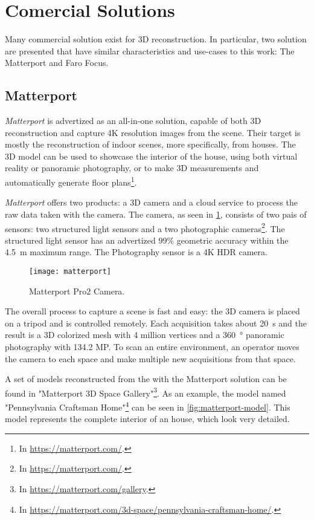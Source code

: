 \section{Comercial Solutions}

Many commercial solution exist for 3D reconstruction. In particular, two solution are presented that have similar characteristics and use-cases to this work: The Matterport and Faro Focus.

\subsection{Matterport}

\emph{Matterport} is advertized as an all-in-one solution, capable of both 3D reconstruction and capture 4K resolution images from the scene. Their target is mostly the reconstruction of indoor scenes, more specifically, from houses. The 3D model can be used to showcase the interior of the house, using both virtual reality or panoramic photography, or to make 3D measurements and automatically generate floor plans\footnote{In \url{https://matterport.com/}.}.

\emph{Matterport} offers two products: a 3D camera and a cloud service to process the raw data taken with the camera. The camera, as seen in \cref{fig:matterport-camera}, consists of two pais of sensors: two structured light sensors and a two photographic cameras\footnote{In \url{https://matterport.com/}.}. The structured light sensor has an advertized $99\%$ geometric accuracy within the \SI{4.5}{\meter} maximum range. The Photography sensor is a 4K HDR camera.

\begin{figure}[h]
    
    \centering
    \texttt{[image: matterport]}

    \caption{Matterport Pro2 Camera.}
    \label{fig:matterport-camera}

\end{figure}

The overall process to capture a scene is fast and easy: the 3D camera is placed on a tripod and is controlled remotely. Each acquisition takes about \SI{20}{\second} and the result is a 3D colorized mesh with 4 million vertices and a \SI{360}{\degree} panoramic photography with 134.2 MP. To scan an entire environment, an operator moves the camera to each space and make multiple new acquisitions from that space.

A set of models reconstructed from the with the Matterport solution can be found in "Matterport 3D Space Gallery"\footnote{In \url{https://matterport.com/gallery}.}. As an example, the model named "Pennsylvania Craftsman Home"\footnote{In \url{https://matterport.com/3d-space/pennsylvania-craftsman-home/}.} can be seen in \cref{fig:matterport-model}. This model represents the complete interior of an house, which look very detailed.

